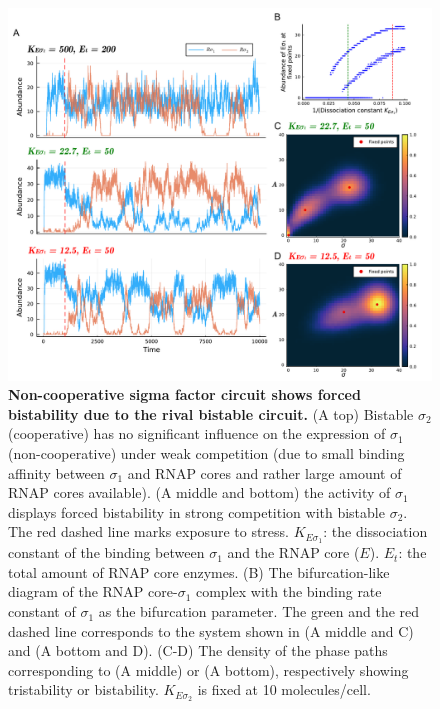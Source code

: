 \begin{figure}[ht]
    \centering
    \includegraphics[width = 6in]{forced_bistability.pdf}
    \caption[
        Non-cooperative sigma factor circuit shows forced bistability
        due to the rival bistable circuit
        ]{
        \textbf{Non-cooperative sigma factor circuit shows forced bistability
        due to the rival bistable circuit.}
        (A top) Bistable $\sigma_2$ (cooperative) has no significant 
        influence on the expression of $\sigma_1$ (non-cooperative) under weak
        competition (due to small binding affinity between $\sigma_1$
        and RNAP cores and rather large amount of RNAP cores available).
        (A middle and bottom) the activity of $\sigma_1$ displays forced 
        bistability in strong competition with bistable $\sigma_2$.
        The red dashed line marks exposure to stress.
        $K_{E\sigma_1}$: the dissociation constant of the 
        binding between $\sigma_1$ and the RNAP core ($E$). 
        $E_t$: the total amount of RNAP core enzymes.
        (B) The bifurcation-like diagram of the RNAP core-$\sigma_1$ complex with
        the binding rate constant of $\sigma_1$ as the bifurcation parameter.
        The green and the red dashed line corresponds to the system shown in
        (A middle and C) and (A bottom and D).
        (C-D) The density of the phase paths corresponding to (A middle)
        or (A bottom), respectively showing tristability or bistability.
        $K_{E\sigma_2}$ is fixed at 10 molecules/cell.
    }
    \label{fig:forced_bistability}
\end{figure}

